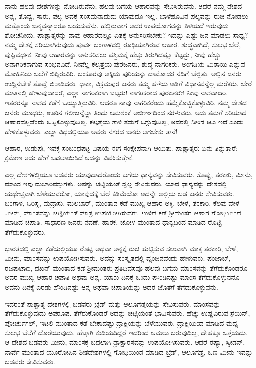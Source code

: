 \newpage

ನಾನು ಹಲವು ದೇಶಗಳನ್ನು ನೋಡಿರುವೆನು; ಹಲವು ಬಗೆಯ ಆಹಾರವನ್ನು ಸೇವಿಸಿರುವೆನು. ಆದರೆ ನಮ್ಮ ದೇಶದ ಅನ್ನ, ತೊವ್ವೆ, ಸಾರು, ಪಲ್ಯ ಅವಕ್ಕೆ ಸರಿಸಮ\break ನಾದುದು ಯಾವುದೂ ಇಲ್ಲ. ಬಾಳೆಹೂವಿನ ಪಲ್ಯವನ್ನು ರುಚಿ ನೋಡಲು ಮತ್ತೊಂದು ಜನ್ಮವನ್ನಾದರೂ ಬಯಸುವೆನು. ಹಲ್ಲಿರುವಾಗ ಅದರ ಉಪಯೋಗವನ್ನು ತಿಳಿಯದೆ ಇರುವುದು ಶೋಚನೀಯ. ಪಾಶ್ಚಾತ್ಯರನ್ನು ನಾವು ಆಹಾರದಲ್ಲೂ ಏತಕ್ಕೆ ಅನುಸರಿಸಬೇಕು? ಇದನ್ನು ಎಷ್ಟು ಜನ ಮಾಡಲು ಸಾಧ್ಯ? ನಮ್ಮ ದೇಶಕ್ಕೆ ಸರಿಯಾಗಿರುವುದು ಪೂರ್ವ ಬಂಗಾಳದಲ್ಲಿ ರೂಢಿಯಾಗಿರುವ ಆಹಾರ. ಶುದ್ಧವಾಗಿದೆ, ಸುಲಭ ಬೆಲೆ, ಪುಷ್ಟಿವರ್ಧಕ. ನೀವು ಆಹಾರವನ್ನು ಅನುಸರಿಸಲು ಪಶ್ಚಿಮಕ್ಕೆ ಹೆಚ್ಚು ತಿರುಗಿದಷ್ಟೂ ಕೆಟ್ಟದ್ದು, ನೀವು ಹೆಚ್ಚು ಅನಾಗರಿಕರಾಗುವ ಸಂಭವವಿದೆ. ನೀವೆಲ್ಲ ಕಲ್ಕತ್ತೆಯ ಪುರಜನರು, ಶುದ್ಧ ನಾಗರಿಕರು. ಅಂಗಡಿಯ ಮಿಠಾಯಿ ಎನ್ನುವ ಮೋಹಿನಿಯ ಬಲೆಗೆ ಬಿದ್ದಿರುವಿರಿ. ಬಂಕೂರವು ಅಕ್ಕಿಯ ಪುರಿಯನ್ನು ದಾಮೋದರ ನದಿಗೆ ಚೆಲ್ಲಿತು. ಅಲ್ಲಿನ ಜನರು ಉದ್ದಿನಬೇಳೆ ತೊವ್ವೆ ಬಿಸಾಡಿದರು. ಢಾಕಾ, ವಿಕ್ರಮಪುರ ಜನರು ತಮ್ಮ ಹಳೆಯ ಅಡಿಗೆ ವಿಧಾನವನ್ನೆಲ್ಲ ಮರೆತರು. ಬೇರೆ ಮಾತಿನಲ್ಲಿ ಹೇಳುವುದಾದರೆ, ಎಲ್ಲಾ ನಾಗರಿಕರಾಗಿ ಬಿಟ್ಟರು! ನಾಗರಿಕರಾದ ಪುರಜನರೇ! ನೀವು ನಾಶವಾದಿರಿ. ಇತರರನ್ನೂ ನಾಶದ ಕಡೆಗೆ ಒಯ್ಯುತ್ತಿರುವಿರಿ. ಆದರೂ ನಾವು ನಾಗರಿಕರೆಂದು ಹೆಮ್ಮೆಕೊಚ್ಚಿಕೊಳ್ಳುವಿರಿ. ನಮ್ಮ ದೇಶದ ಜನರು ಮೂಢರು, ಊರಿನ ಗಲೀಜನ್ನೆಲ್ಲಾ ತಿಂದು ಆಮಶಂಕೆ ಅಜೀರ್ಣದಿಂದ ನರಳುವರು. ಅದು ತಮಗೆ ಸರಿಯಾದ ಆಹಾರವಲ್ಲವೆಂದು ಒಪ್ಪಿಕೊಳ್ಳುವುದಿಲ್ಲ. ಕಲ್ಕತ್ತೆಯ ಗಾಳಿ ತಮಗೆ ಒಗ್ಗುವುದಿಲ್ಲ, ಅದರಲ್ಲಿ ನೀರಿನ ಆವಿ ಇದೆ ಎಂದು ಹೇಳಿಕೊಳ್ಳುವರು. ಎಲ್ಲಾ ವಿಧದಲ್ಲಿಯೂ ಅವರು ನಗರದ ಜನರು ಆಗಬೇಕು ತಾನೆ!

ಆಹಾರ, ಉಡುಪು, ಇವಕ್ಕೆ ಸಂಬಂಧಪಟ್ಟ ವಿಷಯ ಈಗ ಸಂಕ್ಷೇಪವಾಗಿ ಆಯಿತು. ಪಾಶ್ಚಾತ್ಯರು ಏನು ತಿನ್ನುತ್ತಾರೆ; ಕ್ರಮೇಣ ಅದು ಹೇಗೆ ಬದಲಾಯಿಸಿದೆ ಅದನ್ನು ವಿವರಿಸುತ್ತೇನೆ.

ಎಲ್ಲ ದೇಶಗಳಲ್ಲಿಯೂ ಬಡವರು ಯಾವುದಾದರೊಂದು ಬಗೆಯ ಧಾನ್ಯವನ್ನು ಸೇವಿಸುವರು. ಸೊಪ್ಪು, ತರಕಾರಿ, ಮೀನು, ಮಾಂಸ ಇವು ದುಬಾರಿವಸ್ತುಗಳು. ಅವನ್ನು ಚಟ್ನಿಯಂತೆ ಸ್ವಲ್ಪ ಸೇವಿಸುವರು. ಯಾವ ಧಾನ್ಯವನ್ನು ದೇಶದಲ್ಲಿ ಯಥೇಚ್ಛವಾಗಿ ಬೆಳೆಯು\break ವರೋ, ಯಾವುದಕ್ಕೆ ಬೆಲೆ ಕಡಿಮೆಯೋ ಅದನ್ನೇ ಅಲ್ಲಿಯ ಬಡ ಜನರು ಸೇವಿಸುವರು. ಬಂಗಾಳ, ಒರಿಸ್ಸ, ಮದ್ರಾಸು, ಮಲಬಾರ್​, ಮುಂತಾದ ಕಡೆ ಮುಖ್ಯ ಆಹಾರ ಅಕ್ಕಿ, ಬೇಳೆ, ತರಕಾರಿ. ಕೆಲವು ವೇಳೆ ಮೀನು, ಮಾಂಸವನ್ನು ಚಟ್ನಿಯಂತೆ ಮಾತ್ರ ಉಪಯೋಗಿಸುವರು. ಉಳಿದ ಕಡೆ ಶ‍್ರೀಮಂತರ ಆಹಾರ ಗೋಧಿಯಿಂದ ಮಾಡಿದ ಚಪಾತಿ. ಸಾಧಾರಣ ಜನರು ನವಣೆ, ಹಾರಕ, ಜೋಳ ಮುಂತಾದ ಧಾನ್ಯದಿಂದ ಮಾಡಿದ ರೊಟ್ಟಿ ತೆಗೆದುಕೊಳ್ಳುವರು.

ಭಾರತದಲ್ಲಿ ಎಲ್ಲಾ ಕಡೆಯಲ್ಲಿಯೂ ರೊಟ್ಟಿ ಅಥವಾ ಅನ್ನಕ್ಕೆ ರುಚಿ ಹುಟ್ಟಿಸುವ ಸಲುವಾಗಿ ಮಾತ್ರ ತರಕಾರಿ, ಬೇಳೆ, ಮೀನು, ಮಾಂಸವನ್ನು ಉಪಯೋಗಿಸುವರು. ಅದನ್ನು ಸಂಸ್ಕೃತದಲ್ಲಿ ವ್ಯಂಜನವೆಂದು ಹೇಳುವರು. ಪಂಜಾಬ್​, ರಜಪುಟಾಣ, ದಖನ್​ ಮುಂತಾದ ಕಡೆ ಶ‍್ರೀಮಂತರು ಪ್ರತಿದಿವಸವೂ ಹಲವು ಬಗೆಯ ಮಾಂಸವನ್ನು ತೆಗೆದುಕೊಂಡರೂ ಅವರ ಮುಖ್ಯ ಆಹಾರ ಚಪಾತಿ ಅಥವಾ ಅನ್ನ. ಯಾರು ದಿನಕ್ಕೆ ಒಂದು ಪೌಂಡಿನಷ್ಟು ಮಾಂಸ ತೆಗೆದುಕೊಳ್ಳುವನೊ ಅವನು ದಿನಕ್ಕೆ ಎರಡು ಪೌಂಡಿನಷ್ಟು ಅನ್ನ ಅಥವಾ ಚಪಾತಿಯನ್ನು ಅದರ ಜೊತೆಗೆ ತೆಗೆದುಕೊಳ್ಳುವನು.

ಇದರಂತೆ ಪಾಶ್ಚಾತ್ಯ ದೇಶಗಳಲ್ಲಿ ಬಡವರು ಬ್ರೆಡ್​ ಮತ್ತು ಆಲೂಗೆಡ್ಡೆಯನ್ನು ಸೇವಿಸು\break ವರು. ಮಾಂಸವನ್ನು ತೆಗೆದುಕೊಳ್ಳುವುದು ಅಪರೂಪ. ತೆಗೆದುಕೊಂಡರೆ ಅದನ್ನು ಚಟ್ನಿ\break ಯಂತೆ ಭಾವಿಸುವರು. ಹೆಚ್ಚು ಉಷ್ಣವಿರುವ ಸ್ಪೆಯಿನ್​, ಪೋರ್ಚುಗಲ್​, ಇಟಲಿ ಮುಂತಾದ ಕಡೆ ಬೇಕಾದಷ್ಟು ದ್ರಾಕ್ಷಿಯನ್ನು ಬೆಳೆಯುವರು. ದ್ರಾಕ್ಷಿಯಿಂದ ಮಾಡಿದ ಮದ್ಯ ಸುಲಭ ಬೆಲೆಗೆ ದೊರೆಯುವುದು. ಹೆಚ್ಚಾಗಿ ಕುಡಿಯದಿದ್ದರೆ ಇದರಿಂದ ಅಮಲು ಬರುವುದಿಲ್ಲ, ದೇಹಕ್ಕೂ ಒಳ್ಳೆಯದು. ಆ ದೇಶದ ಬಡವರು ಮೀನು, ಮಾಂಸಕ್ಕೆ ಬದಲಾಗಿ ದ್ರಾಕ್ಷಾರಸ\break ವನ್ನು ಉಪಯೋಗಿಸುವರು. ಆದರೆ ರಷ್ಯಾ, ಸ್ವೀಡನ್​, ನಾರ್ವೆ ಮುಂತಾದ ಯೂರೋಪಿನ ಶೀತದೇಶಗಳಲ್ಲಿ ಗೋಧಿಯಿಂದ ಮಾಡಿದ ಬ್ರೆಡ್​, ಆಲೂಗಡ್ಡೆ, ಒಣ ಮೀನು ಇವನ್ನು ಬಡವರು ಸೇವಿಸುವರು.

